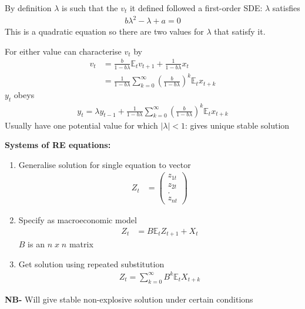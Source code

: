 \documentclass{beamer}
\begin{document}
\begin{frame}
  By definition $\lambda$ is such that the $v_t$ it defined followed a first-order SDE: $\lambda$ satisfies 
  \begin{align}
    b\lambda^2 - \lambda + a=0
  \end{align}
  \medskip
  This is a quadratic equation so there are two values for $\lambda$ that satisfy it.
\end{frame}

\begin{frame}
 For either value can characterise $v_t$ by
 \begin{align}
  v_t &= \frac{b}{1-b\lambda}\mathbb{E}_t v_{t+1} + \frac{1}{1-b\lambda}x_t\\
  &= \frac{1}{1-b\lambda}\sum^{\infty}_{k=0}\left(\frac{b}{1-b\lambda}\right)^k \mathbb{E}_t x_{t+k}
\end{align}
$y_t$ obeys
\begin{align}
  y_t=\lambda y_{t-1} + \frac{1}{1-b\lambda}\sum^{\infty}_{k=0}\left(\frac{b}{1-b\lambda}\right)^k \mathbb{E}_t x_{t+k} 
\end{align}
 Usually have one potential value for which $|\lambda|<1$: gives unique stable solution
\end{frame}

\begin{frame}
  \textbf{Systems of RE equations:}\\
  \begin{enumerate}
    \item Generalise solution for single equation to vector
    \begin{align}
    Z_t&=\begin{pmatrix}      z_{1t} \\ z_{2t} \\ . \\ z_{nt}  \end{pmatrix}     
    \end{align}
    \item Specify as macroeconomic model
     \begin{align}
        Z_t&=B\mathbb{E}_tZ_{t+1} + X_t
     \end{align}   
     $B$ is an $n\; x\; n$ matrix
     \item Get solution using repeated substitution
     \begin{align}  
        Z_t=\sum^{\infty}_{k=0}B^k \mathbb{E}_t X_{t+k}  
      \end{align}
  \end{enumerate}  
  \textbf{NB-} Will give stable non-explosive solution under certain conditions
\end{frame}
\end{document}
